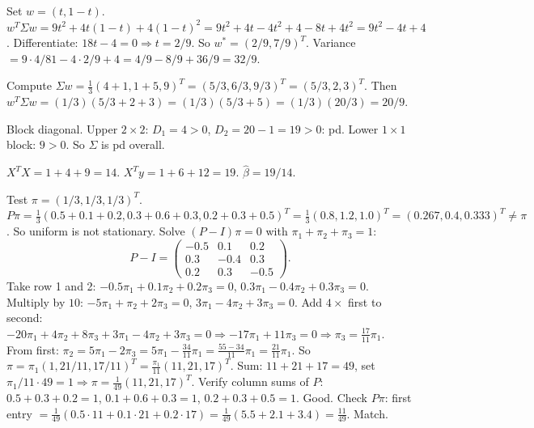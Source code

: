 \begin{solutions}
  \item Set $w = (t, 1 - t)$.
        $w^{T} \Sigma w = 9 t^{2} + 4 t(1 - t) + 4(1 - t)^{2} = 9 t^{2} + 4 t - 4 t^{2} + 4 - 8 t + 4 t^{2} = 9 t^{2} - 4 t + 4$.
        Differentiate: $18 t - 4 = 0 \Rightarrow t = 2/9$. So
        $w^{*} = (2/9, 7/9)^{T}$. Variance
        $= 9 \cdot 4/81 - 4 \cdot 2/9 + 4 = 4/9 - 8/9 + 36/9 = 32/9$.

  \item Compute
        $\Sigma w = \tfrac{1}{3}(4 + 1, 1 + 5, 9)^{T} = (5/3, 6/3, 9/3)^{T} = (5/3, 2, 3)^{T}$.
        Then
        $w^{T} \Sigma w = (1/3)(5/3 + 2 + 3) = (1/3)(5/3 + 5) = (1/3)(20/3) = 20/9$.

  \item Block diagonal. Upper $2 \times 2$: $D_{1} = 4 > 0$,
        $D_{2} = 20 - 1 = 19 > 0$: pd. Lower $1 \times 1$ block: $9 > 0$.
        So $\Sigma$ is pd overall.

  \item $X^{T} X = 1 + 4 + 9 = 14$. $X^{T} y = 1 + 6 + 12 = 19$.
        $\hat{\beta} = 19/14$.

  \item Test $\pi = (1/3, 1/3, 1/3)^{T}$.
        $P \pi = \tfrac{1}{3}(0.5 + 0.1 + 0.2, 0.3 + 0.6 + 0.3, 0.2 + 0.3 + 0.5)^{T} = \tfrac{1}{3}(0.8, 1.2, 1.0)^{T} = (0.267, 0.4, 0.333)^{T} \neq \pi$.
        So uniform is not stationary. Solve $(P - I)\pi = 0$ with
        $\pi_{1} + \pi_{2} + \pi_{3} = 1$:
        \[
        P - I = \begin{pmatrix} -0.5 & 0.1 & 0.2 \\ 0.3 & -0.4 & 0.3 \\ 0.2 & 0.3 & -0.5 \end{pmatrix}.
        \]
        Take row 1 and 2:
        $-0.5 \pi_{1} + 0.1 \pi_{2} + 0.2 \pi_{3} = 0$,
        $0.3 \pi_{1} - 0.4 \pi_{2} + 0.3 \pi_{3} = 0$. Multiply by $10$:
        $-5 \pi_{1} + \pi_{2} + 2 \pi_{3} = 0$,
        $3 \pi_{1} - 4 \pi_{2} + 3 \pi_{3} = 0$. Add $4 \times$ first to
        second:
        $-20 \pi_{1} + 4 \pi_{2} + 8 \pi_{3} + 3 \pi_{1} - 4 \pi_{2} + 3 \pi_{3} = 0 \Rightarrow -17 \pi_{1} + 11 \pi_{3} = 0 \Rightarrow \pi_{3} = \tfrac{17}{11} \pi_{1}$.
        From first:
        $\pi_{2} = 5 \pi_{1} - 2 \pi_{3} = 5 \pi_{1} - \tfrac{34}{11} \pi_{1} = \tfrac{55 - 34}{11} \pi_{1} = \tfrac{21}{11} \pi_{1}$.
        So
        $\pi = \pi_{1}(1, 21/11, 17/11)^{T} = \tfrac{\pi_{1}}{11}(11, 21, 17)^{T}$.
        Sum: $11 + 21 + 17 = 49$, set
        $\pi_{1}/11 \cdot 49 = 1 \Rightarrow \pi = \tfrac{1}{49}(11, 21, 17)^{T}$.
        Verify column sums of $P$: $0.5 + 0.3 + 0.2 = 1$,
        $0.1 + 0.6 + 0.3 = 1$, $0.2 + 0.3 + 0.5 = 1$. Good. Check $P \pi$:
        first entry
        $= \tfrac{1}{49}(0.5 \cdot 11 + 0.1 \cdot 21 + 0.2 \cdot 17) = \tfrac{1}{49}(5.5 + 2.1 + 3.4) = \tfrac{11}{49}$.
        Match.


\end{solutions}
